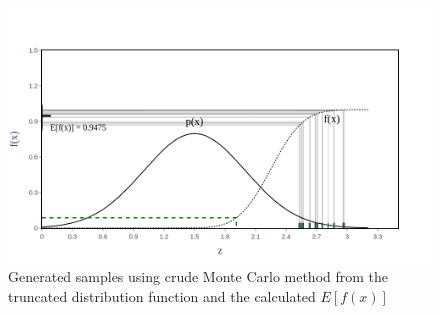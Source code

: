     \begin{figure}[H]
        \centering
        \includegraphics[scale=0.30]{Figures/Images/Illustrative Example/truncated_MC.png}
        \caption{Generated samples using crude Monte Carlo method from the truncated distribution function and the calculated $E[f(x)]$}
        \label{fig:truncated_MC}
    \end{figure}